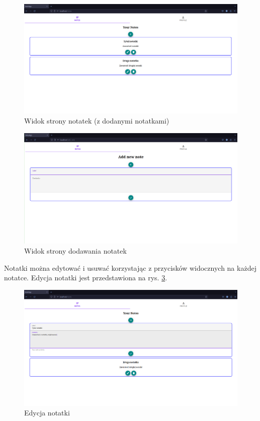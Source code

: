 \documentclass[a4paper,twoside,12pt]{book}
\begin{document}
\begin{figure}[H]
\centering
\includegraphics[width=1.0\textwidth]{./images/dodane-notatki.png}
\caption{Widok strony notatek (z dodanymi notatkami)}
\label{fig:strona-notatkek}
\end{figure}

\begin{figure}[H]
\centering
\includegraphics[width=1.0\textwidth]{./images/strona-dodawania-notatek.png}
\caption{Widok strony dodawania notatek}
\label{fig:strona-dodawania-notatek}
\end{figure}

Notatki można edytować i usuwać korzystając z przycisków widocznych na każdej notatce.
Edycja notatki jest przedstawiona na rys. \ref{fig:edycja-notatki}.

\begin{figure}[H]
\centering
\includegraphics[width=1.0\textwidth]{./images/edycja-notatki.png}
\caption{Edycja notatki}
\label{fig:edycja-notatki}
\end{figure}
\end{document}
